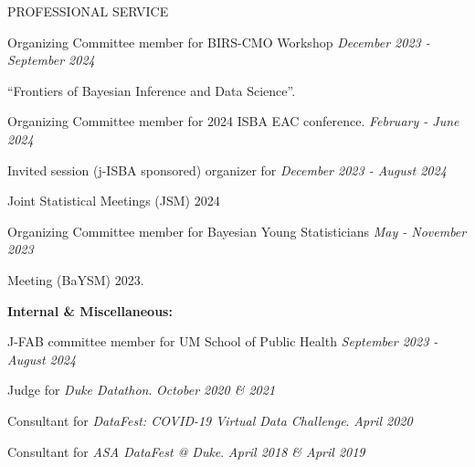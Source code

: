 \documentclass{resume} %
\newcommand{\thisYear}[1]{
	#1
}
\begin{document}
\begin{rSection}{PROFESSIONAL SERVICE}
 	\thisYear{
 Organizing Committee member for BIRS-CMO Workshop	\hfill {\em December 2023 - September 2024}
 
\vspace{-0.1in}

``Frontiers of Bayesian Inference and Data Science''. 
}

 
\smallskip 
 
		\thisYear{
Organizing Committee member for 2024 ISBA EAC conference. 	\hfill {\em February - June 2024}
}
	
\smallskip

	\thisYear{
Invited session (j-ISBA sponsored) organizer for  \hfill  {\em December 2023 - August 2024}

\vspace{-0.1in}

Joint Statistical Meetings (JSM) 2024
}

\smallskip
	
Organizing Committee member for Bayesian Young Statisticians  \hfill {\em May - November 2023}

\vspace{-0.1in}
Meeting (BaYSM) 2023.


 \hspace*{-0.2in}\textbf{Internal \& Miscellaneous: }
 
 	\thisYear{
 J-FAB committee member for UM School of Public Health \hfill {\em September 2023 - August 2024}
}

Judge for \emph{Duke Datathon}.  \hfill {\em October 2020 \& 2021}







\smallskip

Consultant for \emph{DataFest: COVID-19 Virtual Data Challenge}.  \hfill {\em April 2020}



\smallskip

Consultant for \emph{ASA DataFest @ Duke}. \hfill {\em April 2018 \& April 2019}
\end{rSection}
\end{document}
